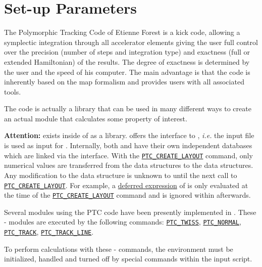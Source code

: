 
\chapter{\ptc Set-up Parameters}
\label{chap:ptc-setup}

The Polymorphic Tracking Code \cite{forest2002} of Etienne
Forest is a kick code, allowing a symplectic integration through all
accelerator elements giving the user full control over the precision
(number of   steps and integration type) and exactness (full or extended
Hamiltonian) of the   results.
The degree of exactness is determined by the user and the speed of his
computer.
The main advantage is that the code is inherently based on the map
formalism and provides users with all associated tools.

The \ptc code is actually a library that can be used in many different
ways to create an actual module that calculates some property of
interest.

\textbf{Attention:}
\ptc exists inside of \madx as a library. \madx offers the interface to
\ptc, \textsl{i.e.} the \madx input file is used as input for \ptc.
Internally, both \ptc and \madx have their own independent databases
which are linked via the interface. With the
\hyperref[sec:ptc-create-layout]{\texttt{PTC\_CREATE\_LAYOUT}} command,
only numerical values are transferred
from the \madx data structures to the \ptc data structures. Any
modification to the \madx data structure is unknown to \ptc until the
next call to \hyperref[sec:ptc-create-layout]{\texttt{PTC\_CREATE\_LAYOUT}}.
For example, a \hyperref[sec:defer]{deferred expression} of \madx is
only evaluated at the time of the
\hyperref[sec:ptc-create-layout]{\texttt{PTC\_CREATE\_LAYOUT}} command and
is ignored within \ptc afterwards.


Several modules using the PTC code have been presently implemented in
\madx. These {\madx}-{\ptc} modules\cite{schmidt2005} are executed by
the following commands:
\hyperref[chap:ptc-twiss]{\texttt{PTC\_TWISS}},
\hyperref[chap:ptc-normal]{\texttt{PTC\_NORMAL}},
\hyperref[chap:ptc-track]{\texttt{PTC\_TRACK}},
\hyperref[sec:ptc-trackline]{\texttt{PTC\_TRACK\_LINE}}.

To perform calculations with these {\madx}-{\ptc} commands, the \ptc
environment must be initialized, handled and turned off by special
commands within the \madx input script.

